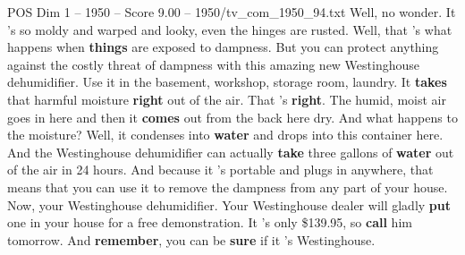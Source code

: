\begin{textsample}{POS Dim 1 – 1950 – Score 9.00 – 1950/tv\_com\_1950\_94.txt}  \label{ex:f1_pos_008}
Well, no wonder.
It 's so moldy and warped and looky, even the hinges are rusted.
Well, that 's what happens when \textbf{things} are exposed to dampness.
But you can protect anything against the costly threat of dampness with this amazing new Westinghouse dehumidifier.
Use it in the basement, workshop, storage room, laundry.
It \textbf{takes} that harmful moisture \textbf{right} out of the air.
That 's \textbf{right}.
The humid, moist air goes in here and then it \textbf{comes} out from the back here dry.
And what happens to the moisture?
Well, it condenses into \textbf{water} and drops into this container here.
And the Westinghouse dehumidifier can actually \textbf{take} three gallons of \textbf{water} out of the air in 24 hours.
And because it 's portable and plugs in anywhere, that means that you can use it to remove the dampness from any part of your house.
Now, your Westinghouse dehumidifier.
Your Westinghouse dealer will gladly \textbf{put} one in your house for a free demonstration.
It 's only \$139.95, so \textbf{call} him tomorrow.
And \textbf{remember}, you can be \textbf{sure} if it 's Westinghouse.

\end{textsample}
